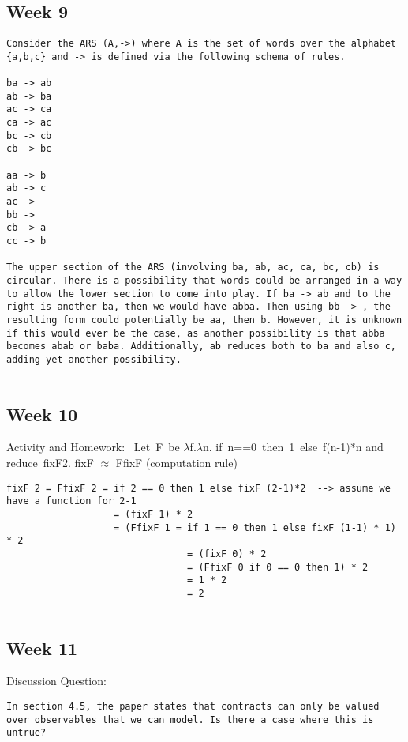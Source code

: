 \documentclass{article}
\theoremstyle{theorem}
\theoremstyle{definition}
\theoremstyle{remark}
\begin{document}
\subsection{Week 9}
\begin{lstlisting}
Consider the ARS (A,->) where A is the set of words over the alphabet {a,b,c} and -> is defined via the following schema of rules.

ba -> ab
ab -> ba
ac -> ca
ca -> ac
bc -> cb
cb -> bc
 
aa -> b
ab -> c
ac ->  
bb -> 
cb -> a
cc -> b

The upper section of the ARS (involving ba, ab, ac, ca, bc, cb) is circular. There is a possibility that words could be arranged in a way to allow the lower section to come into play. If ba -> ab and to the right is another ba, then we would have abba. Then using bb -> , the resulting form could potentially be aa, then b. However, it is unknown if this would ever be the case, as another possibility is that abba becomes abab or baba. Additionally, ab reduces both to ba and also c, adding yet another possibility. 


\end{lstlisting}

\subsection{Week 10}
Activity and Homework: 
\newline\indent
Let F be $\lambda$f.$\lambda$n. if n==0 then 1 else f(n-1)*n and reduce fixF2.
\newline\indent
fixF $\approx$ FfixF (computation rule)

\begin{lstlisting}
fixF 2 = FfixF 2 = if 2 == 0 then 1 else fixF (2-1)*2  --> assume we have a function for 2-1
                   = (fixF 1) * 2
                   = (FfixF 1 = if 1 == 0 then 1 else fixF (1-1) * 1) * 2
                                = (fixF 0) * 2
                                = (FfixF 0 if 0 == 0 then 1) * 2
                                = 1 * 2
                                = 2
               
\end{lstlisting}

\subsection{Week 11}
Discussion Question:
\begin{lstlisting}
In section 4.5, the paper states that contracts can only be valued over observables that we can model. Is there a case where this is untrue? 
\end{lstlisting}
\end{document}
